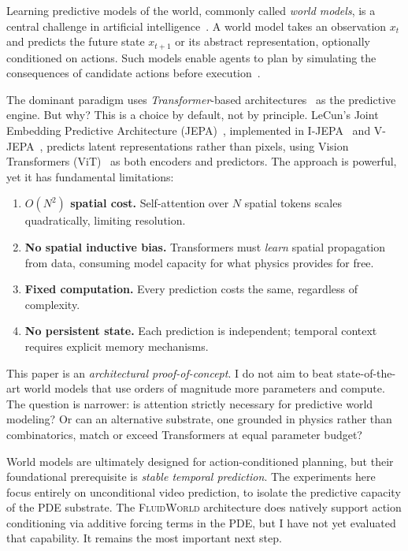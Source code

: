 \documentclass{article}
\newcommand{\fluidworld}{\textsc{FluidWorld}}
\begin{document}
Learning predictive models of the world, commonly called \emph{world models}, is a central challenge in artificial intelligence~\cite{lecun2022path,ha2018worldmodels}. A world model takes an observation $x_t$ and predicts the future state $x_{t+1}$ or its abstract representation, optionally conditioned on actions. Such models enable agents to plan by simulating the consequences of candidate actions before execution~\cite{hafner2023dreamerv3,schrittwieser2020muzero}.

The dominant paradigm uses \emph{Transformer}-based architectures~\cite{vaswani2017attention} as the predictive engine. But why? This is a choice by default, not by principle. LeCun's Joint Embedding Predictive Architecture (JEPA)~\cite{lecun2022path}, implemented in I-JEPA~\cite{assran2023ijepa} and V-JEPA~\cite{bardes2024vjepa}, predicts latent representations rather than pixels, using Vision Transformers (ViT)~\cite{dosovitskiy2021vit} as both encoders and predictors. The approach is powerful, yet it has fundamental limitations:

\begin{enumerate}
    \item \textbf{$O(N^2)$ spatial cost.} Self-attention over $N$ spatial tokens scales quadratically, limiting resolution.
    \item \textbf{No spatial inductive bias.} Transformers must \emph{learn} spatial propagation from data, consuming model capacity for what physics provides for free.
    \item \textbf{Fixed computation.} Every prediction costs the same, regardless of complexity.
    \item \textbf{No persistent state.} Each prediction is independent; temporal context requires explicit memory mechanisms.
\end{enumerate}

This paper is an \emph{architectural proof-of-concept}. I do not aim to beat state-of-the-art world models that use orders of magnitude more parameters and compute. The question is narrower: is attention strictly necessary for predictive world modeling? Or can an alternative substrate, one grounded in physics rather than combinatorics, match or exceed Transformers at equal parameter budget?

World models are ultimately designed for action-conditioned planning, but their foundational prerequisite is \emph{stable temporal prediction}. The experiments here focus entirely on unconditional video prediction, to isolate the predictive capacity of the PDE substrate. The \fluidworld{} architecture does natively support action conditioning via additive forcing terms in the PDE, but I have not yet evaluated that capability. It remains the most important next step.
\end{document}
